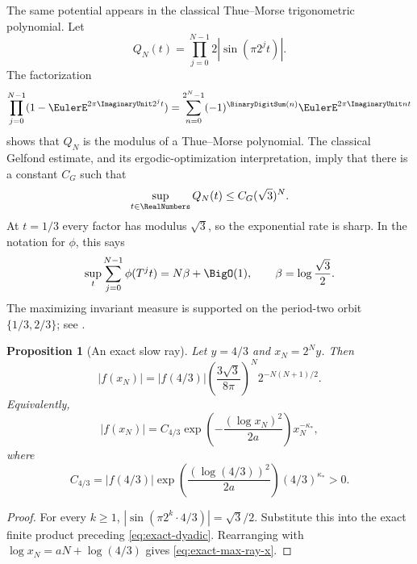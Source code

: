 \documentclass[11pt,oneside]{article}
\newtheorem{proposition}[theorem]{Proposition}
\theoremstyle{definition}
\theoremstyle{remark}
\newcommand{\T}{T}
\begin{document}
The same potential appears in the classical Thue--Morse trigonometric
polynomial.  Let
\begin{equation}
 Q_N(t)=\prod_{j=0}^{N-1}2|\sin(\pi2^jt)|.
 \label{eq:QN-product}
\end{equation}
The factorization
\begin{equation}
 \prod_{j=0}^{N-1}(1-\EulerE^{2\pi\ImaginaryUnit2^jt})
 =\sum_{n=0}^{2^N-1}(-1)^{\BinaryDigitSum(n)}\EulerE^{2\pi\ImaginaryUnit nt}           \label{eq:tm-poly}
\end{equation}
shows that $Q_N$ is the modulus of a Thue--Morse polynomial.  The classical
Gelfond estimate, and its ergodic-optimization interpretation, imply that
there is a constant $C_G$ such that
\begin{equation}
 \sup_{t\in\RealNumbers}Q_N(t)\le C_G(\sqrt3)^N.                     \label{eq:gelfond}
\end{equation}
At $t=1/3$ every factor has modulus $\sqrt3$, so the exponential rate is
sharp.  In the notation for $\phi$, this says
\begin{equation}
 \sup_t\sum_{j=0}^{N-1}\phi(\T^jt)=N\beta+\BigO(1),
 \qquad \beta=\log\frac{\sqrt3}{2}.                        \label{eq:max-birkhoff}
\end{equation}
The maximizing invariant measure is supported on the period-two orbit
$\{1/3,2/3\}$; see \cite{gelfond1968,fan2021,zhang2018}.

\begin{proposition}[An exact slow ray]
Let $y=4/3$ and $x_N=2^Ny$.  Then
\begin{equation}
 |f(x_N)|
 =|f(4/3)|
 \left(\frac{3\sqrt3}{8\pi}\right)^N
 2^{-N(N+1)/2}.                                             \label{eq:exact-max-ray}
\end{equation}
Equivalently,
\begin{equation}
 |f(x_N)|=C_{4/3}
 \exp\!\left(-\frac{(\log x_N)^2}{2a}\right)x_N^{-\kappa_*},
 \label{eq:exact-max-ray-x}
\end{equation}
where
\begin{equation}
 C_{4/3}=|f(4/3)|
 \exp\!\left(\frac{(\log(4/3))^2}{2a}\right)(4/3)^{\kappa_*}>0.
\end{equation}
\end{proposition}

\begin{proof}
For every $k\ge1$,
$|\sin(\pi2^k\cdot4/3)|=\sqrt3/2$.  Substitute this into the exact finite
product preceding \eqref{eq:exact-dyadic}.  Rearranging with
$\log x_N=aN+\log(4/3)$ gives \eqref{eq:exact-max-ray-x}.
\end{proof}
\end{document}
